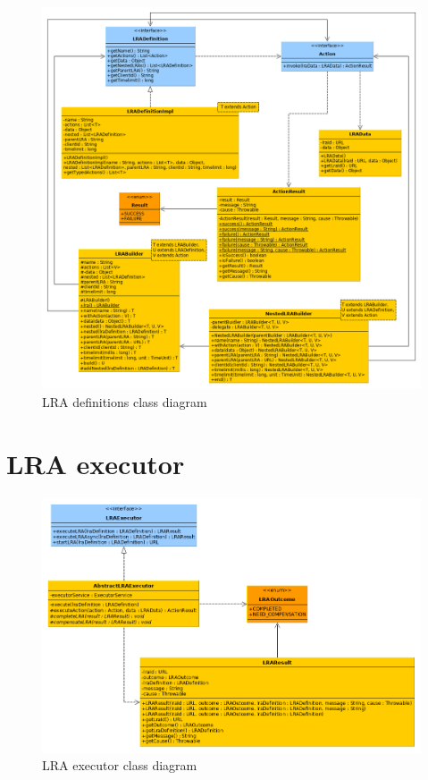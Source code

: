 \documentclass[oneside,
  digital, %
  table,   %
  lof,     %
  lot,     %
]{fithesis3}
\begin{document}
\begin{figure}[h]
    \begin{center}
       \includegraphics[trim=4cm 0 -2cm 4cm,width=1.1\textwidth]{images/classDiagrams/lra-definitions.png}
    \end{center}
    \caption{LRA definitions class diagram}
    \label{fig:lra-definition-class-diagram}
\end{figure}

\clearpage

\section{LRA executor}

\begin{figure}[h]
    \begin{center}
        \includegraphics[trim=5cm 0 0 -2cm,width=1.2\textwidth]{images/classDiagrams/lra-executor.png}
    \end{center}
    \caption{LRA executor class diagram}
    \label{fig:lra-executor-class-diagram}
\end{figure}
\end{document}
